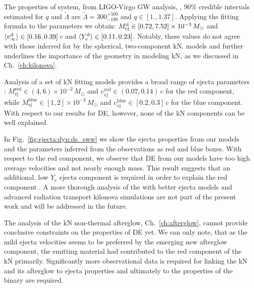 %
%
The properties of \GW{} system, from LIGO-Virgo \ac{GW} analysis, 
\citep{TheLIGOScientific:2017qsa,Abbott:2018wiz,De:2018uhw,Abbott:2018exr} \ie, 
$90\%$ credible intervals estimated for $q$ and $\tilde{\Lambda}$ 
are
$\tilde{\Lambda}=300_{-190}^{+500}$ and $q\in[1., 1.37]$. 
Applying the \polql{} fitting formula %
to the \GW{} parameters we obtain:
%
$M^{\text{d}}_{\text{ej}} \in [0.72, 7.52] \times 10^{-3}\, M_{\odot}$
and
$\langle v^{\text{d}}_\infty\rangle \in [0.16, 0.39]\,$c 
and 
$\langle Y^{\text{d}}_{e}\rangle \in [0.11, 0.23]$.
%
Notably, these values do not agree with those inferred for \AT{} by the spherical, 
two-component \ac{kN}. models \citep{Villar:2017wcc} and further underlines the 
importance of the geometry in modeling \ac{kN}, as we discussed in Ch.~\ref{ch:kilonova}.


Analysis of a set of \ac{kN} fitting models provides a broad range of ejecta 
parameters \citep{Siegel:2019mlp}:
%
$M_{\text{ej}}^{\text{red}}\in(4, 6)\times10^{-2}\,M_{\odot}$ and
$\upsilon_{\text{ej}}^{\text{red}}\in(0.07, 0.14)\,c$ for the red component, while
$M_{\text{ej}}^{\text{blue}}\in[1, 2]\times10^{-2}\,M_{\odot}$ and 
$\upsilon_{\text{ej}}^{\text{blue}}\in[0.2, 0.3]\,c$ for the blue component.
%
With respect to our results for \ac{DE}, however, 
none of the \ac{kN} components can be well explained.

In Fig.~\ref{fig:ejecta:dyn:ds_sww} we show the ejecta properties from our 
models and the parameters inferred from the
observations as red and blue boxes. 
%
With respect to the red component, we observe that \ac{DE} from our models 
have too high average velocities and not nearly enough mass.
This result suggests that an additional, low $Y_e$ ejecta component is required
in order to explain the \AT{} red component 
\citep{Perego:2017wtu,Kawaguchi:2018ptg,Nedora:2019jhl}.
%
A more thorough analysis of the \AT{} with better ejecta models and advanced
radiation transport kilonova simulations are not part of the present work 
and will be addressed in the future.

The analysis of the \ac{kN} non-thermal afterglow, Ch.~\ref{ch:afterglow}, 
cannot provide conclusive constraints on the properties of \ac{DE} yet. 
We can only note, that as the mild ejecta velocities seems to be preferred by the 
emerging new \GRB{} afterglow component, the emitting material had contributed 
to the red component of the \ac{kN} primarily.
%
Significantly more observational data is required for linking the \ac{kN} and 
its afterglow to ejecta properties and ultimately to the properties of the 
binary are required.



